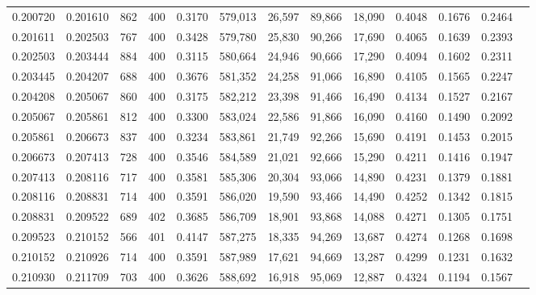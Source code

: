 \begin{tabular}{rrrrrrrrrrrrr}
0.200720 & 0.201610 &   862 & 400 &                                     0.3170 & 579,013 &  26,597 &  89,866 &  18,090 & 0.4048 & 0.1676 & 0.2464 \\
0.201611 & 0.202503 &   767 & 400 &                                     0.3428 & 579,780 &  25,830 &  90,266 &  17,690 & 0.4065 & 0.1639 & 0.2393 \\
0.202503 & 0.203444 &   884 & 400 &                                     0.3115 & 580,664 &  24,946 &  90,666 &  17,290 & 0.4094 & 0.1602 & 0.2311 \\
0.203445 & 0.204207 &   688 & 400 &                                     0.3676 & 581,352 &  24,258 &  91,066 &  16,890 & 0.4105 & 0.1565 & 0.2247 \\
0.204208 & 0.205067 &   860 & 400 &                                     0.3175 & 582,212 &  23,398 &  91,466 &  16,490 & 0.4134 & 0.1527 & 0.2167 \\
0.205067 & 0.205861 &   812 & 400 &                                     0.3300 & 583,024 &  22,586 &  91,866 &  16,090 & 0.4160 & 0.1490 & 0.2092 \\
0.205861 & 0.206673 &   837 & 400 &                                     0.3234 & 583,861 &  21,749 &  92,266 &  15,690 & 0.4191 & 0.1453 & 0.2015 \\
0.206673 & 0.207413 &   728 & 400 &                                     0.3546 & 584,589 &  21,021 &  92,666 &  15,290 & 0.4211 & 0.1416 & 0.1947 \\
0.207413 & 0.208116 &   717 & 400 &                                     0.3581 & 585,306 &  20,304 &  93,066 &  14,890 & 0.4231 & 0.1379 & 0.1881 \\
0.208116 & 0.208831 &   714 & 400 &                                     0.3591 & 586,020 &  19,590 &  93,466 &  14,490 & 0.4252 & 0.1342 & 0.1815 \\
0.208831 & 0.209522 &   689 & 402 &                                     0.3685 & 586,709 &  18,901 &  93,868 &  14,088 & 0.4271 & 0.1305 & 0.1751 \\
0.209523 & 0.210152 &   566 & 401 &                                     0.4147 & 587,275 &  18,335 &  94,269 &  13,687 & 0.4274 & 0.1268 & 0.1698 \\
0.210152 & 0.210926 &   714 & 400 &                                     0.3591 & 587,989 &  17,621 &  94,669 &  13,287 & 0.4299 & 0.1231 & 0.1632 \\
0.210930 & 0.211709 &   703 & 400 &                                     0.3626 & 588,692 &  16,918 &  95,069 &  12,887 & 0.4324 & 0.1194 & 0.1567 \\

\end{tabular}

